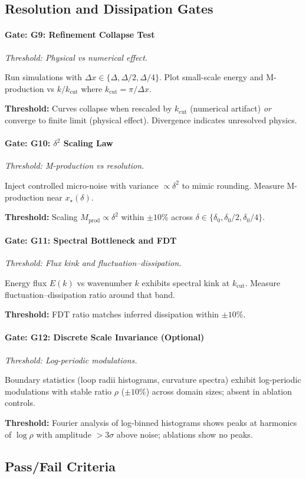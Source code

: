 \documentclass{article}
\newenvironment{vdmgate}[2]{%
  \paragraph{Gate: #1} \emph{Threshold: #2.}%
  \par\noindent}{\medskip}
\begin{document}
\subsection*{Resolution and Dissipation Gates}

\begin{vdmgate}{G9: Refinement Collapse Test}{Physical vs numerical effect}
Run simulations with $\Delta x \in \{\Delta, \Delta/2, \Delta/4\}$. Plot small-scale energy and M-production vs $k/k_{\text{cut}}$ where $k_{\text{cut}} = \pi/\Delta x$.

\textbf{Threshold:} Curves collapse when rescaled by $k_{\text{cut}}$ (numerical artifact) \emph{or} converge to finite limit (physical effect). Divergence indicates unresolved physics.
\end{vdmgate}

\begin{vdmgate}{G10: $\delta^2$ Scaling Law}{M-production vs resolution}
Inject controlled micro-noise with variance $\propto \delta^2$ to mimic rounding. Measure M-production near $x_\star(\delta)$.

\textbf{Threshold:} Scaling $M_{\text{prod}} \propto \delta^2$ within $\pm 10\%$ across $\delta \in \{\delta_0, \delta_0/2, \delta_0/4\}$.
\end{vdmgate}

\begin{vdmgate}{G11: Spectral Bottleneck and FDT}{Flux kink and fluctuation--dissipation}
Energy flux $E(k)$ vs wavenumber $k$ exhibits spectral kink at $k_{\text{cut}}$. Measure fluctuation--dissipation ratio around that band.

\textbf{Threshold:} FDT ratio matches inferred dissipation within $\pm 10\%$.
\end{vdmgate}

\begin{vdmgate}{G12: Discrete Scale Invariance (Optional)}{Log-periodic modulations}
Boundary statistics (loop radii histograms, curvature spectra) exhibit log-periodic modulations with stable ratio $\rho$ ($\pm 10\%$) across domain sizes; absent in ablation controls.

\textbf{Threshold:} Fourier analysis of log-binned histograms shows peaks at harmonics of $\log \rho$ with amplitude $> 3\sigma$ above noise; ablations show no peaks.
\end{vdmgate}

\subsection*{Pass/Fail Criteria}
\end{document}
